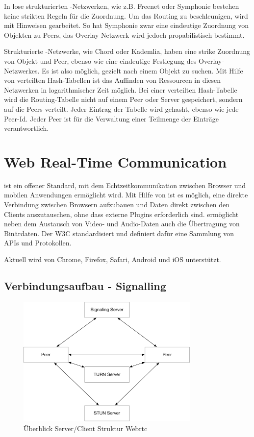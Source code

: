 In lose strukturierten \pTp-Netzwerken, wie z.B. Freenet\cite{freenet} oder Symphonie\cite{symphonie} bestehen keine strikten Regeln für die Zuordnung. Um das Routing zu beschleunigen, wird mit Hinweisen gearbeitet. So hat Symphonie zwar eine eindeutige Zuordnung von Objekten zu Peers, das Overlay-Netzwerk wird jedoch propabilistisch bestimmt. 

Strukturierte \pTp-Netzwerke, wie Chord\cite{chord} oder Kademlia\cite{kademlia}, haben eine strike Zuordnung von Objekt und Peer, ebenso wie eine eindeutige Festlegung des Overlay-Netzwerkes. Es ist also möglich, gezielt nach einem Objekt zu suchen. Mit Hilfe von verteilten Hash-Tabellen ist das Auffinden von Ressourcen in diesen Netzwerken in logarithmischer Zeit möglich. Bei einer verteilten Hash-Tabelle wird die Routing-Tabelle nicht auf einem Peer oder Server gespeichert, sondern auf die Peers verteilt. Jeder Eintrag der Tabelle wird gehasht, ebenso wie jede Peer-Id. Jeder Peer ist für die Verwaltung einer Teilmenge der Einträge verantwortlich. 

\section{\webrtc Web Real-Time Communication}

\webrtc ist ein offener Standard, mit dem Echtzeitkommunikation zwischen Browser und mobilen Anwendungen ermöglicht wird. Mit Hilfe von \webrtc ist es möglich, eine direkte Verbindung zwischen Browsern aufzubauen und Daten direkt zwischen den Clients auszutauschen, ohne dass externe Plugins erforderlich sind. \webrtc ermöglicht neben dem Austausch von Video- und Audio-Daten auch die Übertragung von Binärdaten.\cite{webrtc-book} Der W3C\cite{w3Webrtc} standardisiert \webrtc und definiert dafür eine Sammlung von APIs und Protokollen.

Aktuell wird \webrtc von Chrome, Firefox, Safari, Android und iOS unterstützt.\cite{caniuse-webrtc}

\subsection{Verbindungsaufbau - Signalling}

\begin{figure}[!h]
	\centering
	\includegraphics[width=0.8\textwidth]{figures/Webrtc_overview}
	\caption[A Figure Short-Title]{Überblick Server/Client Struktur Webrtc}
	\label{fig:webrtc_overview}
\end{figure}

